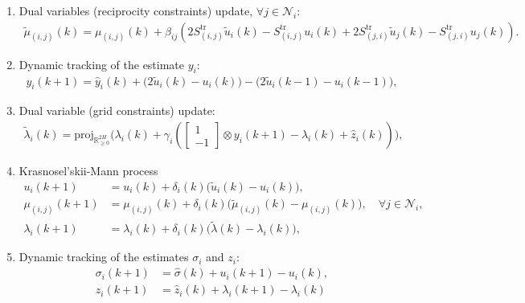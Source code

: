 \documentclass[10pt]{article}
\newcommand{\mc}{\mathcal}
\newcommand{\bb}{\mathbb}
\newcommand{\R}{\bb R}
\newcommand{\proj}{\mathrm{proj}}
\newcommand{\0}{\mathbf{0}}
\newcommand{\1}{\mathbf{1}}
\begin{document}
\begin{algorithm}[H]
\begin{enumerate}[(1)]
\item Dual variables (reciprocity constraints) update, $\forall j \in \mc N_i$:
	\vspace*{-.5em}
	\begin{align*}
	\tilde \mu_{(i,j)}(k) = \mu_{(i,j)}(k) + \beta_{ij} \left( 
	2  S^{\textrm{tr}}_{(i,j)} \tilde u_{i}(k)- S^{\textrm{tr}}_{(i,j)} u_{i}(k) +  2S^{\textrm{tr}}_{(j,i)}  \tilde u_{j}(k)  - S^{\textrm{tr}}_{(j,i)}  u_{j}(k) 
	\right).
	\end{align*}
	
\item Dynamic tracking of the estimate $y_i$:
\begin{align*}
y_i(k+1) = \hat y_i(k) + \big(2 \tilde u_i(k)-u_i(k)\big)-\big( 2 \tilde u_i(k-1) - u_i(k-1) \big),
\end{align*}

	\item Dual variable (grid constraints) update:
	\vspace*{-.5em}
	\begin{align*}
	\tilde \lambda_i(k) = \textstyle
	\proj_{\R^{2 H}_{\geq 0}} \big( 
	\lambda_i(k) + \gamma_i \left( 
	\left[
	\begin{smallmatrix}
	1\\
	- 1 
	\end{smallmatrix}
	\right] \otimes y_i(k+1) - \lambda_i(k) + \hat z_i(k)
	\right)
	\big),
	\end{align*}
	
	\item Krasnosel'skii-Mann process
	 \begin{align*}
u_i(k+1) &= u_i(k) + \delta_i(k) \big( \tilde u_i(k)
- u_i(k) \big),\\
%
\mu_{(i,j)}(k+1) &= \mu_{(i,j)}(k) + \delta_i(k) \big( \tilde \mu_{(i,j)}(k)
- \mu_{(i,j)}(k) \big), \quad \forall j \in \mc N_i,\\
%
\lambda_i(k+1) &= \lambda_i(k) + \delta_i(k) \big( \tilde \lambda(k)
- \lambda_i(k) \big), 	
\end{align*}	

	\item Dynamic tracking of the estimates $\sigma_i$ and $z_i$:
	\vspace*{-.5em}
	\begin{align*}
\sigma_i(k+1) &= \hat \sigma(k) + u_i(k+1) - u_i(k),\\
%
z_i(k+1) &= \hat z_i(k) + \lambda_i(k+1) - \lambda_i(k)
	\end{align*}
\end{enumerate}
	
\end{algorithm}



\end{document}
